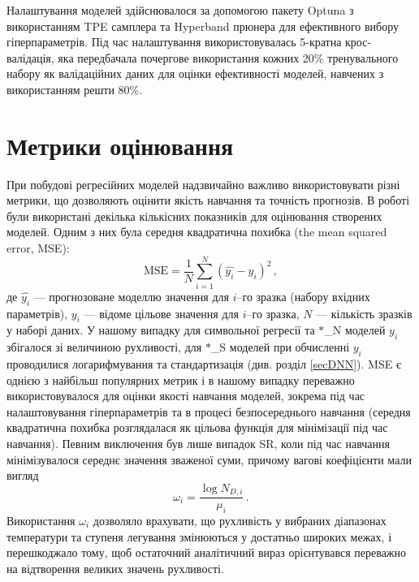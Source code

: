 \documentclass[14pt,a4paper,titlepage,oneside]{book}
\numberwithin{equation}{part}
\begin{document}
Налаштування моделей здійснювалося за допомогою пакету Optuna \cite{Akiba2019} з використанням TPE самплера та Hyperband прюнера
для ефективного вибору гіперпараметрів.
Під час налаштування використовувалась 5-кратна крос-валідація, яка передбачала почергове використання кожних 20\% тренувального набору
як валідаційних даних для оцінки ефективності моделей, навчених з використанням решти 80\%.




\section{Метрики оцінювання}

При побудові регресійних моделей надзвичайно важливо використовувати різні метрики,
що дозволяють оцінити якість навчання та точність прогнозів.
В роботі були використані декілька кількісних показників для оцінювання створених моделей.
Одним з них була середня квадратична похибка (the mean squared error, MSE):
\begin{equation}
\label{eqMSE}
    \mathrm{MSE} = \frac{1}{N}\displaystyle\sum_{i=1}^{N} (\hat{y_i}-y_i)^2\,,
\end{equation}
де
$\hat{y_i}$ --- прогнозоване моделлю значення для $i$--го зразка (набору вхідних параметрів),
$y_i$ --- відоме цільове значення для $i$--го зразка,
$N$ --- кількість зразків у наборі даних.
У нашому випадку для символьної регресії та $*$\_N моделей $y_i$ збігалося зі величиною рухливості,
для $*$\_S моделей при обчисленні $y_i$ проводилися логарифмування та стандартизація (див. розділ \ref{secDNN}).
MSE є однією з найбільш популярних метрик і в нашому випадку переважно використовувалося для оцінки якості
навчання моделей, зокрема під час налаштовування гіперпараметрів та в процесі безпосереднього навчання (середня квадратична похибка розглядалася як
цільова функція для мінімізації під час навчання).
Певним виключення був лише випадок SR, коли під час навчання мінімізувалося середнє значення зваженої суми, причому вагові коефіцієнти мали вигляд
\begin{equation}
\label{eqWi}
    \omega_i = \frac{\log N_{D,i}}{\mu_i}\,.
\end{equation}
Використання $\omega_i$ дозволяло врахувати, що рухливість у вибраних діапазонах температури та ступеня легування
змінюються у достатньо широких межах, і перешкоджало тому, щоб остаточний аналітичний вираз орієнтувався переважно
на відтворення великих значень рухливості.
\end{document}

